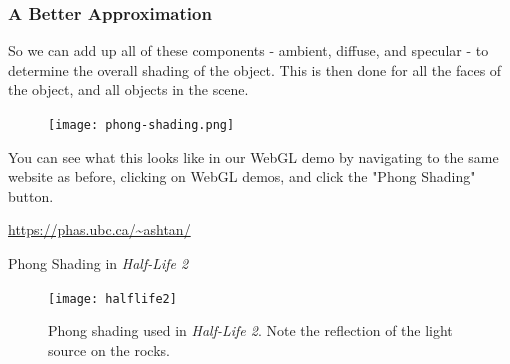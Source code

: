 \documentclass[12pt]{beamer}
\begin{document}
  \begin{frame}
    \frametitle{A Better Approximation}

    So we can add up all of these components - ambient, diffuse, and specular - to determine the overall shading of the object.
    This is then done for all the faces of the object, and all objects in the scene.

    \begin{figure}
      \centering
      \texttt{[image: phong-shading.png]}\label{fig:phong-shading}
    \end{figure}

    You can see what this looks like in our WebGL demo by navigating to the same website as before, clicking on WebGL demos, and click the "Phong Shading" button.

    \url{https://phas.ubc.ca/~ashtan/}

  \end{frame}

  \begin{frame}{Phong Shading in \textit{Half-Life 2}}

    \begin{figure}
      \centering
      \texttt{[image: halflife2]}
      \caption{Phong shading used in \textit{Half-Life 2}. Note the reflection of the light source on the rocks.}
      \label{fig:hl2}
    \end{figure}

  \end{frame}




\end{document}
